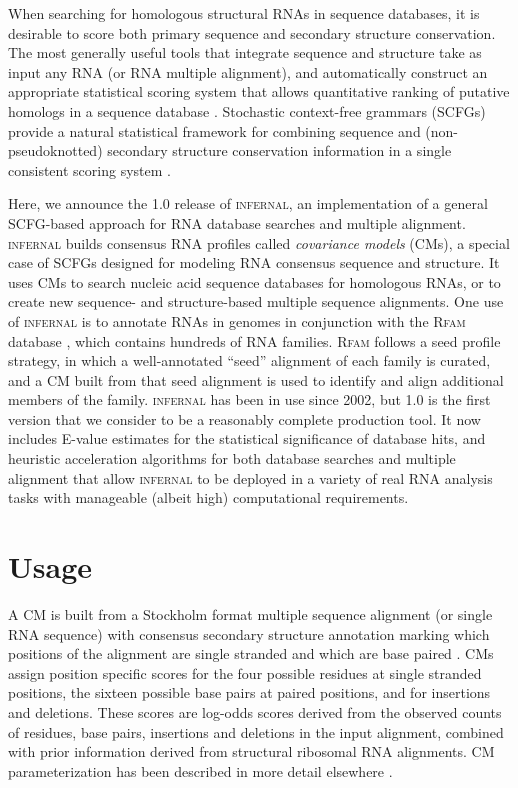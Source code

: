 \documentclass{bioinfo}
\begin{document}
\begin{application}
When searching for homologous structural RNAs in sequence databases,
it is desirable to score both primary sequence and secondary structure
conservation.  The most generally useful tools that integrate sequence
and structure take as input any RNA (or RNA multiple alignment), and
automatically construct an appropriate statistical scoring system that
allows quantitative ranking of putative homologs in a sequence
database \citep{Gautheret01,ZhangBafna05,Huang08}.  Stochastic
context-free grammars (SCFGs) provide a natural statistical framework
for combining sequence and (non-pseudoknotted) secondary structure
conservation information in a single consistent scoring system
\citep{Sakakibara94c,Eddy94,Brown00,Durbin98}.

Here, we announce the 1.0 release of \textsc{infernal}, an
implementation of a general SCFG-based approach for RNA database
searches and multiple alignment. \textsc{infernal} builds consensus
RNA profiles called \emph{covariance models} (CMs), a special case of
SCFGs designed for modeling RNA consensus sequence and structure. It
uses CMs to search nucleic acid sequence databases for homologous
RNAs, or to create new sequence- and structure-based multiple
sequence alignments. One use of \textsc{infernal} is to annotate RNAs
in genomes in conjunction with the \textsc{Rfam} database
\citep{Gardner09}, which contains hundreds of RNA families.
\textsc{Rfam} follows a seed profile strategy, in which a
well-annotated ``seed'' alignment of each family is curated, and a CM
built from that seed alignment is used to identify and align
additional members of the family.  \textsc{infernal} has been in use
since 2002, but 1.0 is the first version that we consider to be a
reasonably complete production tool. It now includes E-value estimates
for the statistical significance of database hits, and heuristic
acceleration algorithms for both database searches and multiple
alignment that allow \textsc{infernal} to be deployed in a variety of
real RNA analysis tasks with manageable (albeit high) computational
requirements.


\section{Usage} 

A CM is built from a Stockholm format multiple sequence alignment (or
single RNA sequence) with consensus secondary structure annotation
marking which positions of the alignment are single stranded and which
are base paired \citep{infguide03}. CMs assign position specific
scores for the four possible residues at single stranded positions,
the sixteen possible base pairs at paired positions, and for
insertions and deletions. These scores are log-odds scores derived
from the observed counts of residues, base pairs, insertions and
deletions in the input alignment, combined with prior information
derived from structural ribosomal RNA alignments.  CM parameterization
has been described in more detail elsewhere
\citep{Eddy94,Eddy02b,KleinEddy03,infguide03,NawrockiEddy07}.


\end{application}
\end{document}
